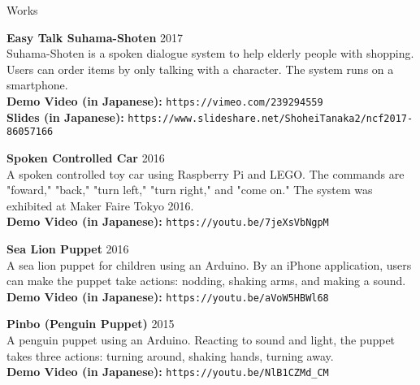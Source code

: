 \documentclass{resume} %
\begin{document}

\begin{rSection}{Works}

{\bf Easy Talk Suhama-Shoten} \hfill 2017
\\
Suhama-Shoten is a spoken dialogue system to help elderly people with shopping.
Users can order items by only talking with a character. 
The system runs on a smartphone.
\\{\bf Demo Video (in Japanese):} \texttt{https://vimeo.com/239294559}
\\{\bf Slides (in Japanese):} \texttt{https://www.slideshare.net/ShoheiTanaka2/ncf2017-86057166}


{\bf Spoken Controlled Car} \hfill 2016
\\
A spoken controlled toy car using Raspberry Pi and LEGO.
The commands are "foward," "back," "turn left," "turn right," and "come on."
The system was exhibited at Maker Faire Tokyo 2016.
\\{\bf Demo Video (in Japanese):} \texttt{https://youtu.be/7jeXsVbNgpM}

{\bf Sea Lion Puppet} \hfill 2016
\\
A sea lion puppet for children using an Arduino.
By an iPhone application, users can make the puppet take actions: nodding, shaking arms, and making a sound.
\\{\bf Demo Video (in Japanese):} \texttt{https://youtu.be/aVoW5HBWl68}

{\bf Pinbo (Penguin Puppet)} \hfill 2015
\\
A penguin puppet using an Arduino.
Reacting to sound and light, the puppet takes three actions: turning around, shaking hands, turning away.
\\{\bf Demo Video (in Japanese):} \texttt{https://youtu.be/NlB1CZMd\_CM}

\end{rSection}
\end{document}
